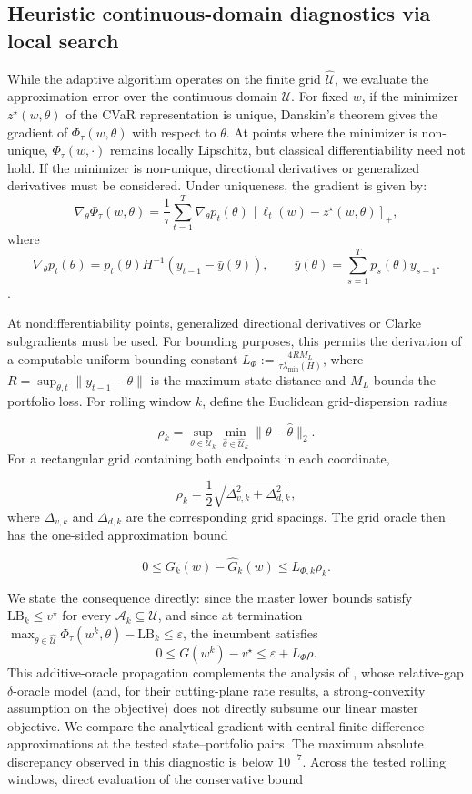 \documentclass[smallextended]{svjour3}
\begin{document}
\subsection{Heuristic continuous-domain diagnostics via local search}\label{sec:certification}
While the adaptive algorithm operates on the finite grid $\widehat{\mathcal{U}}$, we evaluate the approximation error over the continuous domain $\mathcal{U}$. For fixed $w$, if the minimizer $z^\star(w,\theta)$ of the CVaR
representation is unique, Danskin's theorem gives the gradient of
$\Phi_\tau(w,\theta)$ with respect to $\theta$. At points where the
minimizer is non-unique, $\Phi_\tau(w,\cdot)$ remains locally Lipschitz,
but classical differentiability need not hold. If the minimizer is non-unique, directional derivatives or generalized derivatives must be considered. Under uniqueness, the gradient is given by:
\begin{equation}
\nabla_\theta \Phi_\tau(w,\theta) = \frac{1}{\tau}\sum_{t=1}^T \nabla_\theta p_t(\theta)\,[\ell_t(w) - z^\star(w,\theta)]_+ ,
\end{equation}
where \[
\nabla_\theta p_t(\theta) = p_t(\theta)H^{-1}(y_{t-1}-\bar y(\theta)),
\qquad
\bar y(\theta) = \sum_{s=1}^T p_s(\theta)y_{s-1}.
\].

 At nondifferentiability points, generalized directional derivatives or Clarke subgradients must be used. For bounding purposes, this permits the derivation of a computable uniform bounding constant $L_\Phi := \frac{4 R M_L}{\tau \lambda_{\min}(H)}$, where $R = \sup_{\theta, t}\|y_{t-1} - \theta\|$ is the maximum state distance and $M_L$ bounds the portfolio loss. 
For rolling window $k$, define the Euclidean grid-dispersion radius

\[
\rho_k = \sup_{\theta\in\mathcal U_k}
\min_{\hat\theta\in\widehat{\mathcal U}_k}
\|\theta-\hat\theta\|_2.
\]
For a rectangular grid containing both endpoints in each coordinate,

\[
\rho_k
=
\frac12\sqrt{\Delta_{v,k}^2+\Delta_{d,k}^2},
\]
where $\Delta_{v,k}$ and $\Delta_{d,k}$ are the corresponding grid spacings.
The grid oracle then has the one-sided approximation bound

\[
0
\le
G_k(w)-\widehat G_k(w)
\le L_{\Phi,k}\rho_k.
\]

We state the consequence directly: since the master lower bounds satisfy $\mathrm{LB}_k \le v^\star$ for every $\mathcal{A}_k \subseteq \mathcal{U}$, and since at termination $\max_{\theta \in \widehat{\mathcal{U}}} \Phi_\tau(w^k,\theta) - \mathrm{LB}_k \le \varepsilon$, the incumbent satisfies
\begin{equation}
0 \le G(w^k) - v^\star \le \varepsilon + L_\Phi \rho .
\end{equation}
This additive-oracle propagation complements the analysis of \citet{oustry2025convex}, whose relative-gap $\delta$-oracle model (and, for their cutting-plane rate results, a strong-convexity assumption on the objective) does not directly subsume our linear master objective. We compare the analytical gradient with central finite-difference
approximations at the tested state--portfolio pairs. The maximum absolute
discrepancy observed in this diagnostic is below $10^{-7}$. Across the tested rolling windows, direct evaluation of the conservative
bound
\end{document}
